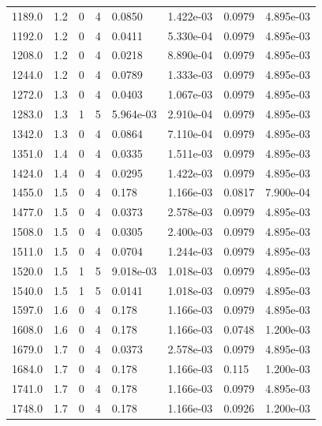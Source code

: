\documentclass[preview]{standalone}
\begin{document}
{{{\begin{tabular}{L{1.2cm}C{1.2cm} C{0.3cm}C{0.5cm} C{1.4cm}C{1.4cm} C{1.4cm}C{1.4cm}}
  1189.0  &   1.2  & 0     &  4 &  0.0850  & 1.422e-03  & 0.0979 &  4.895e-03   \\ 
  1192.0  &   1.2  & 0     &  4 &  0.0411  & 5.330e-04  & 0.0979 &  4.895e-03   \\ 
  1208.0  &   1.2  & 0     &  4 &  0.0218  & 8.890e-04  & 0.0979 &  4.895e-03   \\ 
  1244.0  &   1.2  & 0     &  4 &  0.0789  & 1.333e-03  & 0.0979 &  4.895e-03   \\ 
  1272.0  &   1.3  & 0     &  4 &  0.0403  & 1.067e-03  & 0.0979 &  4.895e-03   \\ 
  1283.0  &   1.3  & 1     &  5 &  5.964e-03  & 2.910e-04  & 0.0979 &  4.895e-03   \\ 
  1342.0  &   1.3  & 0     &  4 &  0.0864  & 7.110e-04  & 0.0979 &  4.895e-03   \\ 
  1351.0  &   1.4  & 0     &  4 &  0.0335  & 1.511e-03  & 0.0979 &  4.895e-03   \\ 
  1424.0  &   1.4  & 0     &  4 &  0.0295  & 1.422e-03  & 0.0979 &  4.895e-03   \\ 
  1455.0  &   1.5  & 0     &  4 &  0.178  & 1.166e-03  & 0.0817 &  7.900e-04   \\ 
  1477.0  &   1.5  & 0     &  4 &  0.0373  & 2.578e-03  & 0.0979 &  4.895e-03   \\ 
  1508.0  &   1.5  & 0     &  4 &  0.0305  & 2.400e-03  & 0.0979 &  4.895e-03   \\ 
  1511.0  &   1.5  & 0     &  4 &  0.0704  & 1.244e-03  & 0.0979 &  4.895e-03   \\ 
  1520.0  &   1.5  & 1     &  5 &  9.018e-03  & 1.018e-03  & 0.0979 &  4.895e-03   \\ 
  1540.0  &   1.5  & 1     &  5 &  0.0141  & 1.018e-03  & 0.0979 &  4.895e-03   \\ 
  1597.0  &   1.6  & 0     &  4 &  0.178  & 1.166e-03  & 0.0979 &  4.895e-03   \\ 
  1608.0  &   1.6  & 0     &  4 &  0.178  & 1.166e-03  & 0.0748 &  1.200e-03   \\ 
  1679.0  &   1.7  & 0     &  4 &  0.0373  & 2.578e-03  & 0.0979 &  4.895e-03   \\ 
  1684.0  &   1.7  & 0     &  4 &  0.178  & 1.166e-03  & 0.115 &  1.200e-03   \\ 
  1741.0  &   1.7  & 0     &  4 &  0.178  & 1.166e-03  & 0.0979 &  4.895e-03   \\ 
  1748.0  &   1.7  & 0     &  4 &  0.178  & 1.166e-03  & 0.0926 &  1.200e-03   \\ 

\end{tabular}}}}
\end{document}
